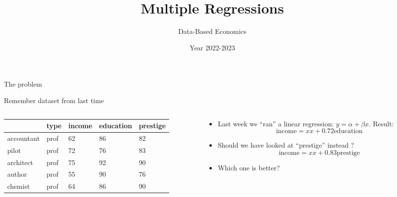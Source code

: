 \documentclass[
  ignorenonframetext,
  aspectratio=169,
]{beamer}
\title{Multiple Regressions}
\subtitle{Data-Based Economics}
\author{Year 2022-2023}
\date{}
\providecommand{\tightlist}{%
  \setlength{\itemsep}{0pt}\setlength{\parskip}{0pt}}\usepackage{longtable,booktabs,array}
\begin{document}
\frame{\titlepage}
\ifdefined\Shaded\renewenvironment{Shaded}{\begin{tcolorbox}[frame hidden, interior hidden, boxrule=0pt, sharp corners, enhanced, breakable, borderline west={3pt}{0pt}{shadecolor}]}{\end{tcolorbox}}\fi

\begin{frame}{The problem}
\protect\hypertarget{the-problem}{}
\begin{block}{Remember dataset from last time}
\protect\hypertarget{remember-dataset-from-last-time}{}
\begin{columns}[T]
\begin{column}{0.48\textwidth}
\begin{longtable}[]{@{}lllll@{}}
\toprule()
& type & income & education & prestige \\
\midrule()
\endhead
accountant & prof & 62 & 86 & 82 \\
pilot & prof & 72 & 76 & 83 \\
architect & prof & 75 & 92 & 90 \\
author & prof & 55 & 90 & 76 \\
chemist & prof & 64 & 86 & 90 \\
\bottomrule()
\end{longtable}
\end{column}

\begin{column}{0.48\textwidth}
\begin{itemize}
\tightlist
\item
  Last week we ``ran'' a linear regression: \(y = \alpha + \beta x\).
  Result: \[\text{income} = xx + 0.72 \text{education}\]
\item
  Should we have looked at ``prestige'' instead ?
  \[\text{income} = xx + 0.83 \text{prestige}\]
\item
  Which one is better?
\end{itemize}
\end{column}
\end{columns}
\end{block}
\end{frame}
\end{document}
